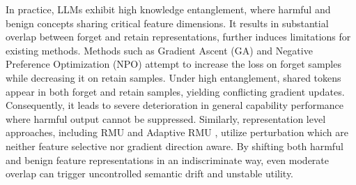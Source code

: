 In practice, LLMs exhibit high knowledge entanglement, where harmful and benign concepts sharing critical feature dimensions. It results in substantial overlap between forget and retain representations, further induces limitations for existing methods. Methods such as Gradient Ascent (GA) \cite{yao2024machine} and Negative Preference Optimization (NPO) \cite{zhang2024negative} attempt to increase the loss on forget samples while decreasing it on retain samples. Under high entanglement, shared tokens appear in both forget and retain samples, yielding conflicting gradient updates. Consequently, it leads to severe deterioration in general capability performance where harmful output cannot be suppressed. Similarly, representation level approaches, including RMU \cite{pmlr-v235-li24bc} and Adaptive RMU \cite{10.1609/aaai.v39i22.34544}, utilize perturbation which are neither feature selective nor gradient direction aware. By shifting both harmful and benign feature representations in an indiscriminate way, even moderate overlap can trigger uncontrolled semantic drift and unstable utility. %
